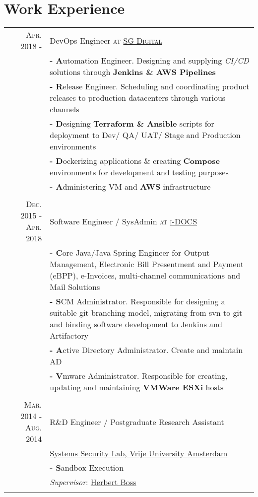 \documentclass[a4paper,10pt]{article} %
\begin{document}
\section{Work Experience}
\begin{tabular}{r|p{}}

\textsc{Apr. 2018 - } & {\large DevOps Engineer \textsc{at \href{https://www.sgdigital.com/}{SG Digital}}} \\
& \textbf{- A}utomation Engineer. Designing and supplying \emph{CI/CD} solutions through \textbf{Jenkins \& AWS Pipelines}  \\
& \textbf{- R}elease Engineer. Scheduling and coordinating product releases to production datacenters through various channels \\
& \textbf{- D}esigning \textbf{Terraform \& Ansible} scripts for deployment to Dev/ QA/ UAT/ Stage and Production environments \\
& \textbf{- D}ockerizing applications \& creating \textbf{Compose} environments for development and testing purposes \\
& \textbf{- A}dministering VM and \textbf{AWS} infrastructure \\
\multicolumn{2}{c}{} \\

\textsc{Dec. 2015 - Apr. 2018} & {\large Software Engineer / SysAdmin \textsc{at \href{https://www.i-docs.com/}{i-DOCS}}} \\
& \textbf{- C}ore Java/Java Spring Engineer for Output Management, Electronic Bill Presentment and Payment (eBPP), e-Invoices,  multi-channel communications and Mail Solutions \\
& \textbf{- S}CM Administrator. Responsible for designing a suitable git branching model, migrating from svn to git and binding software development to Jenkins and Artifactory \\
& \textbf{- A}ctive Directory Administrator. Create and maintain AD \\
& \textbf{- V}mware Administrator. Responsible for creating, updating and maintaining \textbf{VMWare ESXi} hosts\\
\multicolumn{2}{c}{} \\

\textsc{Mar. 2014 - Aug. 2014} & {\large R\&D Engineer / Postgraduate Research Assistant} \\
&  {\large \href{https://www.vusec.net/}{Systems Security Lab, Vrije University Amsterdam}} \\
& \textbf{- S}andbox Execution \\
& \emph{Supervisor}: \href{https://www.cs.vu.nl/~herbertb/}{Herbert Boss} \\
\multicolumn{2}{c}{} \\


\end{tabular}
\end{document}
